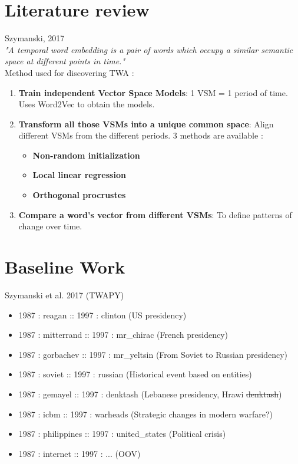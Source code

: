 \documentclass[10pt]{beamer}
\begin{document}
\section{Literature review}
\begin{frame}{Szymanski, 2017}
     \\ 
    \textit{"A temporal word embedding is a pair of words which occupy a similar semantic space at different points in time."} \cite{szymanski2017temporal} \\
    Method used for discovering TWA : 
    
    \begin{enumerate}
        \item \textbf{Train independent Vector Space Models}: 1 VSM = 1 period of time. Uses Word2Vec to obtain the models.   
        \item \textbf{Transform all those VSMs into a unique common space}: Align different VSMs from the different periods. 3 methods are available : 
            \begin{itemize}
                \item \textbf{Non-random initialization}
                \item \textbf{Local linear regression} 
                \item \textbf{Orthogonal procrustes}
            \end{itemize}
        \item  \textbf{Compare a word's vector from different VSMs}: To define patterns of change over time. 
    \end{enumerate}
\end{frame}

\section{Baseline Work}

\begin{frame}{Szymanski et al. 2017 (TWAPY)}
    \begin{itemize}
        \item 1987 : reagan :: 1997 : clinton (US presidency)
        \item 1987 : mitterrand :: 1997 : mr\_chirac (French presidency)
        \item 1987 : gorbachev :: 1997 : mr\_yeltsin (From Soviet to Russian presidency)
        \item 1987 : soviet :: 1997 : russian (Historical event based on entities)
        \item 1987 : gemayel :: 1997 : denktash (Lebanese presidency, Hrawi \sout{denktash}) %
        \item 1987 : icbm :: 1997 : warheads (Strategic changes in modern warfare?)
        \item 1987 : philippines :: 1997 : united\_states (Political crisis)
        \item 1987 : internet :: 1997 : ... (OOV)
    \end{itemize}   

\end{frame}
\end{document}

